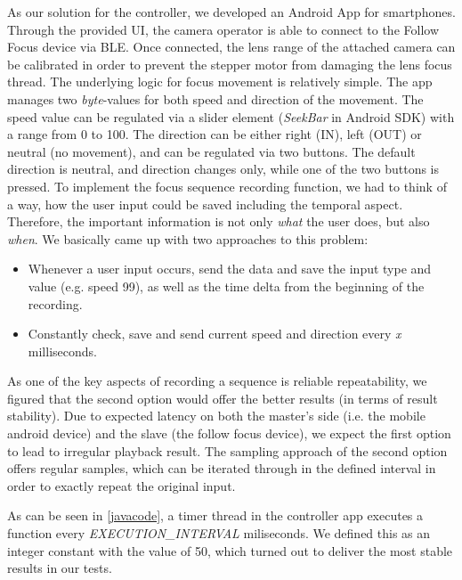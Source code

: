 \documentclass{sigchi}
\begin{document}
As our solution for the controller, we developed an Android App for smartphones. Through the provided UI, the camera operator is able to connect to the Follow Focus device via BLE. 
Once connected, the lens range of the attached camera can be calibrated in order to prevent the stepper motor from damaging the lens focus thread.
The underlying logic for focus movement is relatively simple. The app manages two \textit{byte}-values for both speed and direction of the movement.
The speed value can be regulated via a slider element (\textit{SeekBar} in Android SDK) with a range from 0 to 100. The direction can be either right (IN), left (OUT) or neutral (no movement), and can be regulated via two buttons. The default direction is neutral, and direction changes only, while one of the two buttons is pressed.  \newline
To implement the focus sequence recording function, we had to think of a way, how the user input could be saved including the temporal aspect. Therefore, the important information is not only \textit{what} the user does, but also \textit{when}. We basically came up with two approaches to this problem: \newline
\begin{itemize}
  \item Whenever a user input occurs, send the data and save the input type and value (e.g. speed 99), as well as the time delta from the beginning of the recording.
  \item Constantly check, save and send current speed and direction every \textit{x} milliseconds.
\end{itemize}

As one of the key aspects of recording a sequence is reliable repeatability, we figured that the second option would offer the better results (in terms of result stability). Due to expected latency on both the master's side (i.e. the mobile android device) and the slave (the follow focus device), we expect the first option to lead to irregular playback result. \newline
The sampling approach of the second option offers regular samples, which can be iterated through in the defined interval in order to exactly repeat the original input.



As can be seen in \autoref{javacode}, a timer thread in the controller app executes a function every \textit{EXECUTION\_INTERVAL} miliseconds. We defined this as an integer constant with the value of 50, which turned out to deliver the most stable results in our tests. 
\end{document}
